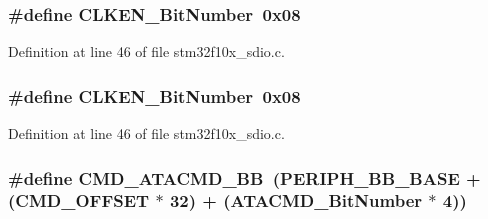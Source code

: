 \subsubsection[{\texorpdfstring{C\+L\+K\+E\+N\+\_\+\+Bit\+Number}{CLKEN_BitNumber}}]{\setlength{\rightskip}{0pt plus 5cm}\#define C\+L\+K\+E\+N\+\_\+\+Bit\+Number~0x08}\hypertarget{group___s_d_i_o___private___types_definitions_ga6ad1da47f9d84c54eb620b9231ebec86}{}\label{group___s_d_i_o___private___types_definitions_ga6ad1da47f9d84c54eb620b9231ebec86}


Definition at line 46 of file stm32f10x\+\_\+sdio.\+c.

\subsubsection[{\texorpdfstring{C\+L\+K\+E\+N\+\_\+\+Bit\+Number}{CLKEN_BitNumber}}]{\setlength{\rightskip}{0pt plus 5cm}\#define C\+L\+K\+E\+N\+\_\+\+Bit\+Number~0x08}\hypertarget{group___s_d_i_o___private___types_definitions_ga6ad1da47f9d84c54eb620b9231ebec86}{}\label{group___s_d_i_o___private___types_definitions_ga6ad1da47f9d84c54eb620b9231ebec86}


Definition at line 46 of file stm32f10x\+\_\+sdio.\+c.

\subsubsection[{\texorpdfstring{C\+M\+D\+\_\+\+A\+T\+A\+C\+M\+D\+\_\+\+BB}{CMD_ATACMD_BB}}]{\setlength{\rightskip}{0pt plus 5cm}\#define C\+M\+D\+\_\+\+A\+T\+A\+C\+M\+D\+\_\+\+BB~({\bf P\+E\+R\+I\+P\+H\+\_\+\+B\+B\+\_\+\+B\+A\+SE} + ({\bf C\+M\+D\+\_\+\+O\+F\+F\+S\+ET} $\ast$ 32) + ({\bf A\+T\+A\+C\+M\+D\+\_\+\+Bit\+Number} $\ast$ 4))}\hypertarget{group___s_d_i_o___private___types_definitions_gabb7e537f931b6fdd3b49e826f2e19d7c}{}\label{group___s_d_i_o___private___types_definitions_gabb7e537f931b6fdd3b49e826f2e19d7c}


